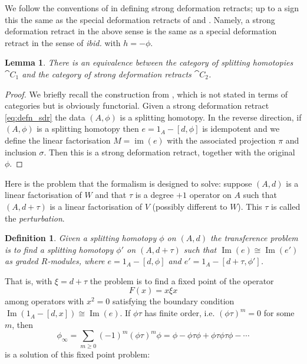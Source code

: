 \documentclass[english,letter paper,12pt,leqno]{article}
\newtheorem{lemma}[theorem]{Lemma}
\theoremstyle{example}
\newtheorem{definition}[theorem]{Definition}
\numberwithin{equation}{section}
\def\im{\operatorname{Im}}
\begin{document}
We follow the conventions of \cite{barneslambe} in defining strong deformation retracts; up to a sign this the same as the special deformation retracts of \cite{crainic} and \cite{dm1102.2957}. Namely, a strong deformation retract in the above sense is the same as a special deformation retract in the sense of \emph{ibid.} with $h = - \phi$.

\begin{lemma}\label{lemma:equivocate} There is an equivalence between the category of splitting homotopies $\cat{C}_1$ and the category of  strong deformation retracts $\cat{C}_2$.
\end{lemma}
\begin{proof}
We briefly recall the construction from \cite[p.883]{barneslambe}, which is not stated in terms of categories but is obviously functorial. Given a strong deformation retract \eqref{eq:defn_sdr} the data $(A, \phi)$ is a splitting homotopy. In the reverse direction, if $(A, \phi)$ is a splitting homotopy then $e = 1_A - [d, \phi]$ is idempotent and we define the linear factorisation $M = \operatorname{im}(e)$ with the associated projection $\pi$ and inclusion $\sigma$. Then this is a strong deformation retract, together with the original $\phi$.
\end{proof}

Here is the problem that the formalism is designed to solve: suppose $(A,d)$ is a linear factorisation of $W$ and that $\tau$ is a degree $+1$ operator on $A$ such that $(A, d + \tau)$ is a linear factorisation of $V$ (possibly different to $W$). This $\tau$ is called the \emph{perturbation}.

\begin{definition} Given a splitting homotopy $\phi$ on $(A,d)$ the \emph{transference problem} is to find a splitting homotopy $\phi'$ on $(A, d + \tau)$ such that $\im(e) \cong \im(e')$ as graded $R$-modules, where $e = 1_A - [d, \phi]$ and $e' = 1_A - [d + \tau, \phi']$. 
\end{definition}

That is, with $\xi = d + \tau$ the problem is to find a fixed point of the operator
\[
F(x) = x \xi x
\]
among operators with $x^2 = 0$ satisfying the boundary condition $\im(1_A - [d,x]) \cong \im(e)$. If $\phi \tau$ has finite order, i.e. $(\phi \tau)^m = 0$ for some $m$, then
\[
\phi_\infty = \sum_{m \ge 0} (-1)^m (\phi \tau)^m \phi = \phi - \phi \tau \phi + \phi \tau \phi \tau \phi - \cdots
\]
is a solution of this fixed point problem:
\end{document}
